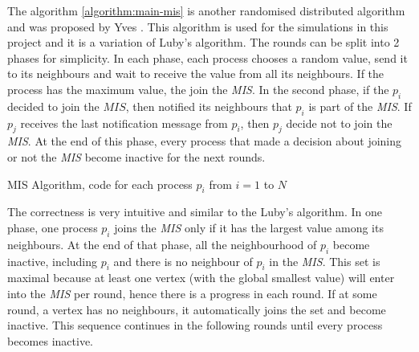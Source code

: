 The algorithm \ref{algorithm:main-mis} is another randomised distributed algorithm and was proposed by Yves \cite{yves2009optimal}. This algorithm is used for the simulations in this project and it is a variation of Luby's algorithm. The rounds can be split into 2 phases for simplicity. In each phase, each process chooses a random value, send it to its neighbours and wait to receive the value from all its neighbours. If the process has the maximum value, the join the \textit{MIS}. In the second phase, if the $p_i$ decided to join the $MIS$, then notified its neighbours that $p_i$ is part of the \textit{MIS}. If $p_j$ receives the last notification message from $p_i$, then $p_j$ decide not to join the \textit{MIS}. At the end of this phase, every process that made a decision about joining or not the \textit{MIS} become inactive for the next rounds.

\begin{algorithm}
 \caption{MIS Algorithm, code for each process $p_i$ from $i = 1$ to $N$}
 \label{algorithm:main-mis} 

\SetAlgoNoLine
{}
\end{algorithm}


The correctness is very intuitive and similar to the Luby's algorithm. In one phase, one process $p_i$ joins the \textit{MIS} only if it has the largest value among its neighbours. At the end of that phase, all the neighbourhood of $p_i$ become inactive, including $p_i$ and there is no neighbour of $p_i$ in the \textit{MIS}. This set is maximal because at least one vertex (with the global smallest value) will enter into the \textit{MIS} per round, hence there is a progress in each round. If at some round, a vertex has no neighbours, it automatically joins the set and become inactive. This sequence continues in the following rounds until every process becomes inactive.

